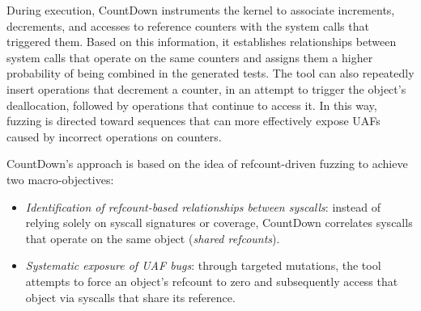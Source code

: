 During execution, CountDown instruments the kernel to associate increments, decrements, and accesses to reference counters with the system calls that triggered them. Based on this information, it establishes relationships between system calls that operate on the same counters and assigns them a higher probability of being combined in the generated tests. The tool can also repeatedly insert operations that decrement a counter, in an attempt to trigger the object's deallocation, followed by operations that continue to access it. In this way, fuzzing is directed toward sequences that can more effectively expose UAFs caused by incorrect operations on counters.

CountDown's approach is based on the idea of refcount-driven fuzzing to achieve two macro-objectives:
\begin{itemize}
    \item \textit{Identification of refcount-based relationships between syscalls}: instead of relying solely on syscall signatures or coverage, CountDown correlates syscalls that operate on the same object (\textit{shared refcounts}).

    \item \textit{Systematic exposure of UAF bugs}: through targeted mutations, the tool attempts to force an object's refcount to zero and subsequently access that object via syscalls that share its reference.
\end{itemize}

